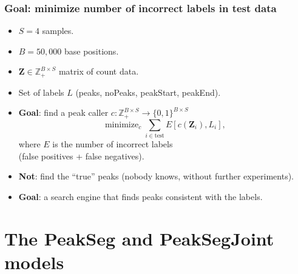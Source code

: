 \documentclass{beamer}
\DeclareMathOperator*{\minimize}{minimize}
\newcommand{\ZZ}{\mathbb Z}
\begin{document}
\begin{frame}
  \frametitle{Goal: minimize number of incorrect labels in test data}
  \begin{itemize}
  \item $S=4$ samples.
  \item $B=50,000$ base positions.
  \item $\mathbf Z \in\ZZ_+^{B\times S}$ matrix of count data.
  \item Set of labels $L$ (peaks, noPeaks, peakStart, peakEnd).
  \item \textbf{Goal}: find a peak caller $c:\ZZ_+^{B\times S} \rightarrow
    \{0,1\}^{B\times S}$ 
  \begin{equation*}
    \label{eq:min_test_err}
    \minimize_c \sum_{i\in\text{test}} E[c(\mathbf Z_i),  L_i],
  \end{equation*}
  where $E$ is the number of incorrect labels\\(false positives + false
  negatives).
\item \textbf{Not}: find the ``true'' peaks (nobody knows, without
  further experiments).
\item \textbf{Goal}: a search engine that finds peaks consistent with
  the labels.
\end{itemize}
\end{frame}

\section{The PeakSeg and PeakSegJoint models} 


\end{document}
